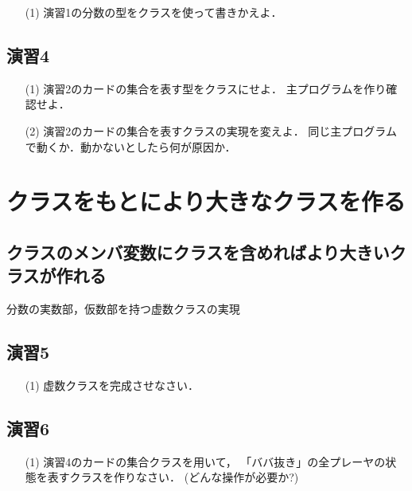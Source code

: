 \begin{enumerate}

 \item[(1)] 演習1の分数の型をクラスを使って書きかえよ．

\end{enumerate}

\subsection{演習4}

\begin{enumerate}

 \item[(1)] 演習2のカードの集合を表す型をクラスにせよ．
主プログラムを作り確認せよ．

 \item[(2)] 演習2のカードの集合を表すクラスの実現を変えよ．
同じ主プログラムで動くか．動かないとしたら何が原因か．

\end{enumerate}

\section{クラスをもとにより大きなクラスを作る}

\subsection{クラスのメンバ変数にクラスを含めればより大きいクラスが作れる}

分数の実数部，仮数部を持つ虚数クラスの実現

\subsection{演習5}

\begin{enumerate}

 \item[(1)] 虚数クラスを完成させなさい．

\end{enumerate}

\subsection{演習6}

\begin{enumerate}

 \item[(1)] 演習4のカードの集合クラスを用いて，
「ババ抜き」の全プレーヤの状態を表すクラスを作りなさい．
(どんな操作が必要か?)

\end{enumerate}

